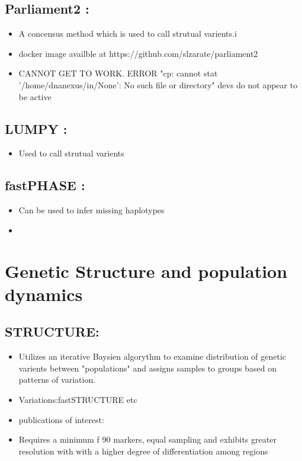 \documentclass[document.tex]{subfiles}
\begin{document}
    \subsection{Parliament2 :}
    \begin{itemize}
    \item A concensus method which is used to call strutual varients.i
    \item docker image availble at https://github.com/slzarate/parliament2 
    \item CANNOT GET TO WORK. ERROR "cp: cannot stat '/home/dnanexus/in/None': No such file or directory" devs do not appear to be active
    \end{itemize}
    
    \subsection{LUMPY :}
    \begin{itemize}
    \item Used to call strutual varients 
    \end{itemize}

    \subsection{fastPHASE :\citetitle{}}
    \begin{itemize}
    \item Can be used to infer missing haplotypes
    \item 
    \end{itemize}

\section*{Genetic Structure and population dynamics}
    \subsection{STRUCTURE: }
        \begin{itemize}
        \item Utilizes an iterative Baysien algorythm to examine distribution of genetic 
        varients between "populations" and assigns samples to groups based on patterns of 
        variation.
        \item Variations:fastSTRUCTURE etc 
        \item publications of interest:
        \item Requires a minimum f 90 markers, equal sampling and exhibits greater resolution with with a higher degree of differentiation among regions \cite{nelson_2013}
        \end{itemize} 
\end{document}
